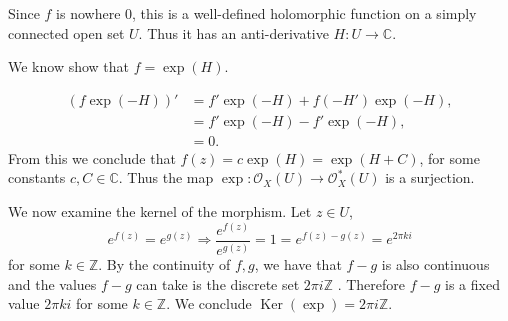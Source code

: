\documentclass{article}
\DeclareMathOperator{\Ker}{Ker}
\begin{document}
Since $f$ is nowhere $0$, this is a well-defined holomorphic function on a simply connected open set $U$. Thus it has an anti-derivative $H:U\to\mathbb{C}$.\\
\par We know show that $f=\exp(H)$. 

\begin{align*}
(f\exp(-H))' & = f'\exp(-H)+f(-H')\exp(-H),\\
& = f'\exp(-H)-f'\exp(-H),\\
& = 0.
\end{align*}
From this we conclude that $f(z) = c\exp(H)=\exp(H+C)$, for some constants $c,C\in\mathbb{C}$. Thus the map $\exp:\mathcal{O}_X(U)\to\mathcal{O}^*_X(U)$ is a surjection.

We now examine the kernel of the morphism. Let $z\in U$,
\begin{equation*}
e^{f(z)} = e^{g(z)} \Rightarrow {\frac {e^{f(z)}} {e^{g(z)}}} = 1 = e^{f(z)-g(z)} = e^{2\pi ki}
\end{equation*}
for some $k\in\mathbb{Z}$. By the continuity of $f,g$, we have that $f-g$ is also continuous and the values $f-g$ can take is the discrete set $2\pi i\mathbb{Z}$ . Therefore $f-g$ is a fixed value $2\pi ki$ for some $k\in\mathbb{Z}$. We conclude $\Ker(\exp)=2\pi i\mathbb{Z}$.
\end{document}

